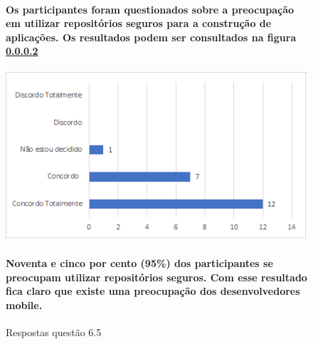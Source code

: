 \begin{figure}[!t]
\centering
\paragraph{Os participantes foram questionados sobre a preocupação em utilizar repositórios seguros para a construção de aplicações. Os resultados podem ser consultados na figura \ref{fig:6.5}}
\includegraphics[scale=0.7]{figuras das questoes/6.5.png}
\caption{Respostas questão 6.5}
\paragraph{Noventa e cinco por cento (95{\%}) dos participantes se preocupam utilizar repositórios seguros. Com esse resultado fica claro que existe uma preocupação dos desenvolvedores mobile.}
\label{fig:6.5}
\end{figure}
